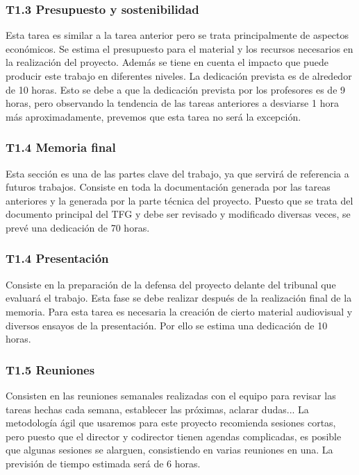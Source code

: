 \subsubsection*{T1.3 Presupuesto y sostenibilidad}
Esta tarea es similar a la tarea anterior pero se trata principalmente de aspectos económicos. Se estima el presupuesto para el material y los recursos necesarios en la realización del proyecto. Además se tiene en cuenta el impacto que puede producir este trabajo en diferentes niveles. La dedicación prevista es de alrededor de 10 horas. Esto se debe a que la dedicación prevista por los profesores es de 9 horas, pero observando la tendencia de las tareas anteriores a desviarse 1 hora más aproximadamente, prevemos que esta tarea no será la excepción.

\subsubsection*{T1.4 Memoria final}
Esta sección es una de las partes clave del trabajo, ya que servirá de referencia a futuros trabajos. Consiste en toda la documentación generada por las tareas anteriores y la generada por la parte técnica del proyecto. Puesto que se trata del documento principal del TFG y debe ser revisado y modificado diversas veces, se prevé una dedicación de 70 horas.

\subsubsection*{T1.4 Presentación}
Consiste en la preparación de la defensa del proyecto delante del tribunal que evaluará el trabajo. Esta fase se debe realizar después de la realización final de la memoria. Para esta tarea es necesaria la creación de cierto material audiovisual y diversos ensayos de la presentación. Por ello se estima una dedicación de 10 horas.

\subsubsection*{T1.5 Reuniones}
Consisten en las reuniones semanales realizadas con el equipo para revisar las tareas hechas cada semana, establecer las próximas, aclarar dudas... La metodología ágil que usaremos para este proyecto recomienda sesiones cortas, pero puesto que el director y codirector tienen agendas complicadas, es posible que algunas sesiones se alarguen, consistiendo en varias reuniones en una. La previsión de tiempo estimada será de 6 horas.

